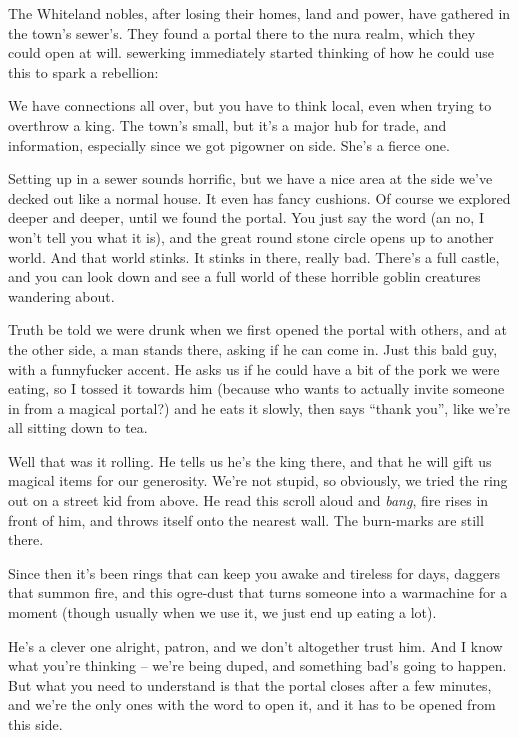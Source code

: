 The Whiteland nobles, after losing their homes, land and power, have gathered in the town's sewer's.  They found a portal there to the nura realm, which they could open at will.  \gls{sewerking} immediately started thinking of how he could use this to spark a rebellion:

\begin{speechtext}

We have connections all over, but you have to think local, even when trying to overthrow a king.  The town's small, but it's a major hub for trade, and information, especially since we got \gls{pigowner} on side.  She's a fierce one.

Setting up in a sewer sounds horrific, but we have a nice area at the side we've decked out like a normal house.  It even has fancy cushions.  Of course we explored deeper and deeper, until we found the portal.  You just say the word (an no, I won't tell you what it is), and the great round stone circle opens up to another world.  And that world stinks.  It stinks in there, really bad.  There's a full castle, and you can look down and see a full world of these horrible goblin creatures wandering about.

Truth be told we were drunk when we first opened the portal with others, and at the other side, a man stands there, asking if he can come in.  Just this bald guy, with a funnyfucker accent.  He asks us if he could have a bit of the pork we were eating, so I tossed it towards him (because who wants to actually invite someone in from a magical portal?) and he eats it slowly, then says ``thank you'', like we're all sitting down to tea.

Well that was it rolling.  He tells us he's the king there, and that he will gift us magical items for our generosity.  We're not stupid, so obviously, we tried the ring out on a street kid from above.  He read this scroll aloud and \emph{bang}, fire rises in front of him, and throws itself onto the nearest wall.  The burn-marks are still there.

Since then it's been rings that can keep you awake and tireless for days, daggers that summon fire, and this ogre-dust that turns someone into a warmachine for a moment (though usually when we use it, we just end up eating a lot).

He's a clever one alright, \gls{patron}, and we don't altogether trust him.  And I know what you're thinking -- we're being duped, and something bad's going to happen.  But what you need to understand is that the portal closes after a few minutes, and we're the only ones with the word to open it, and it has to be opened from this side.

\end{speechtext}

